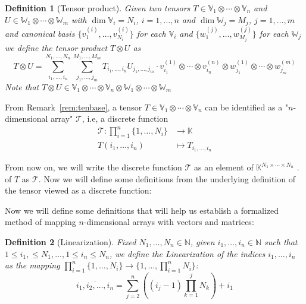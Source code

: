 \documentclass[11pt,a4paper,openright,oneside]{book}
\numberwithin{equation}{section}
\newtheorem{defn0}{Definition}[chapter]
\newenvironment{definition}{ \begin{defn0}}{\end{defn0}}
\newcommand{\remref}[1]{Remark~\ref{#1}}
\begin{document}
\begin{definition}[Tensor product] Given two tensors $T \in \mathbb{V}_1 \otimes \cdots \otimes \mathbb{V}_n$ and ${U \in \mathbb{W}_1 \otimes \cdots \otimes
    \mathbb{W}_m}$ with $\dim \mathbb{V}_i = N_i$, $i = 1, \dots, n$ and $\dim \mathbb{W}_j = M_j$, $j = 1, \dots, m$ 
    and canonical basis $\{v_1^{(i)}, \dots, v_{N_i}^{(i)}\}$ for each $\mathbb{V}_i$ and $\{w_1^{(j)}, \dots, w_{M_j}^{(j)}\}$ for each $\mathbb{W}_j$
    we define the tensor product
    $T \otimes U$ as
    $$ T \otimes U = \sum_{i_1, \dots, i_n}^{N_1, \dots, N_n} \sum_{j_1, \dots, j_m}^{M_1, \dots, M_m} T_{i_1, \dots, i_n} U_{j_1, \dots, j_m} \cdot
    v_{i_1}^{(1)} \otimes \cdots \otimes v_{i_n}^{(n)} \otimes w_{j_1}^{(1)} \otimes \cdots \otimes w_{j_m}^{(m)}$$
    Note that $T \otimes U \in \mathbb{V}_1 \otimes \cdots \otimes \mathbb{V}_n \otimes \mathbb{W}_1 \otimes \cdots \otimes \mathbb{W}_m$

\end{definition}

From \remref{rem:tenbase}, a tensor $T \in \mathbb{V}_1 \otimes \cdots \otimes \mathbb{V}_n$ can be identified as a "$n$-dimensional array" $\mathcal{T}$, i.e,
a discrete function
$$\begin{align}
    \mathcal{T}: \prod_{i=1}^n \{1, \dots, N_i\} & \longrightarrow \mathbb{K} \\
    T(i_1, \dots, i_n) & \longmapsto T_{i_1, \dots, i_n}
\end{align}$$

From now on, we will write the discrete function $\mathcal{T}$ as
an element of ${\mathbb{K}^{N_1 \times \cdots \times N_n}}$ \cite{yokotaVeryBasicsTensors2024}.
of $T$ as $\mathcal{T}$. Now we will define some definitions from the underlying definition of the tensor viewed as a discrete function:

Now we will define some definitions that will help us establish a formalized method of mapping $n$-dimensional arrays with
vectors and matrices:

\begin{definition}[Linearization]
    Fixed $N_1, \dots, N_n \in \mathbb{N}$, given $i_1, \dots, i_n \in \mathbb{N}$ such that $1 \leqslant i_1, \leqslant N_1, \dots, 1 \leqslant i_n \leqslant N_n$,
    we define the Linearization of the indices $i_1, \dots, i_n$ as the mapping ${\prod_{i=1}^n \{1, \dots, N_i\} \rightarrow \{1, \dots, \prod_{i=1}^n N_i\}}$:
    $$\overline {i_1, i_2, \dots, i_n} = \sum_{j=2}^{n} \left( (i_j - 1) \prod_{k=1}^j N_k \right) + i_1$$
\end{definition}
\end{document}
